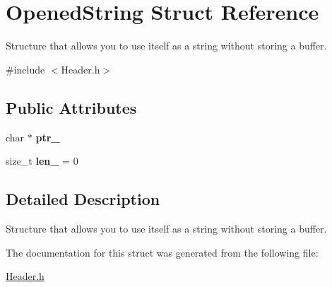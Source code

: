 \hypertarget{struct_opened_string}{}\section{Opened\+String Struct Reference}
\label{struct_opened_string}


Structure that allows you to use itself as a string without storing a buffer.  




{\ttfamily \#include $<$Header.\+h$>$}

\subsection*{Public Attributes}
\begin{DoxyCompactItemize}
\item 
\mbox{\label{struct_opened_string_a808ef1362ded4753b63c4f393ffb55fa}} 
char $\ast$ {\bfseries ptr\+\_\+}
\item 
\mbox{\label{struct_opened_string_aba1adf0ce6571dabda87be669f205f2c}} 
size\+\_\+t {\bfseries len\+\_\+} = 0
\end{DoxyCompactItemize}


\subsection{Detailed Description}
Structure that allows you to use itself as a string without storing a buffer. 

The documentation for this struct was generated from the following file\+:\begin{DoxyCompactItemize}
\item 
\hyperlink{_header_8h}{Header.\+h}\end{DoxyCompactItemize}
